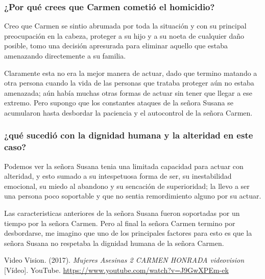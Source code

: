 \documentclass[12pt]{article}
\begin{document}
\subsubsection*{¿Por qué crees que Carmen cometió el homicidio?}

	\par Creo que Carmen se sintio abrumada por toda la situaci\'on y con su principal preocupaci\'on en la cabeza, proteger a su hijo y a su noeta de cualquier da\~no posible, tomo una decisi\'on apresurada para eliminar aquello que estaba amenazando directemente a su familia. 
	\par Claramente esta no era la mejor manera de actuar, dado que termino matando a otra persona cuando la vida de las personas que trataba proteger a\'un no estaba amenazada; a\'un hab\'ia muchas otras formas de actuar sin tener que llegar a ese extremo. Pero supongo que los constantes ataques de la se\~nora Susana se acumularon hasta desbordar la paciencia y el autocontrol de la se\~nora Carmen.

\subsubsection*{¿qué sucedió con la dignidad humana y la alteridad en este caso?}

	\par Podemos ver la se\~nora Susana tenia una limitada capacidad para actuar con alteridad, y esto sumado a su intespetuosa forma de ser, su inestabilidad emocional, su miedo al abandono y su sencaci\'on de superioridad; la llevo a ser una persona poco soportable y que no sentia remordimiento alguno por su actuar.
	\par Las caracteristicas anteriores de la se\~nora Susana fueron soportadas por un tiempo por la se\~nora Carmen. Pero al final la se\~nora Carmen termino por desbordarse, me imagino que uno de los principales factores para esto es que la se\~nora Susana no respetaba la dignidad humana de la se\~nora Carmen.




\begin{thebibliography}{X}
	 Video Vision. (2017). \textit{Mujeres Asesinas 2 CARMEN HONRADA videovision} [Vídeo]. YouTube. \url{https://www.youtube.com/watch?v=J9GwXPEm-ek} 
\end{thebibliography}
\end{document}
